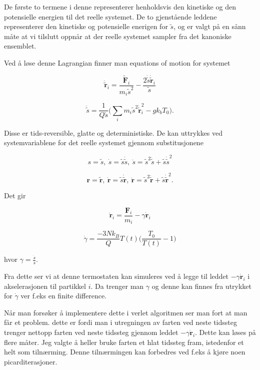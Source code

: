 \documentclass[a4paper,10pt]{article}
\begin{document}
De første to termene i denne representerer henholdsvis den kinetiske og den potensielle energien til det reelle systemet. De to gjenstående leddene representerer den kinetiske og potensielle enerigen for $\tilde{s}$, og er valgt på en sånn måte at vi tilslutt oppnår at der reelle systemet sampler fra det kanoniske ensemblet.

Ved å løse denne Lagrangian finner man equations of motion for systemet

\begin{equation}
 \mathbf{\ddot{\tilde{r}}}_i = \frac{\mathbf{\tilde{F}}_i}{m_i\tilde{s}^2}-\frac{2\dot{\tilde{s}}\mathbf{\dot{\tilde{r}}}_i}{\tilde{s}}
\end{equation}

\begin{equation}
 \ddot{\tilde{s}} = \frac{1}{Q\tilde{s}}\bigg(\sum_im_i\tilde{s}^2\mathbf{\dot{\tilde{r}}}_i^2-gk_bT_0\bigg).
\end{equation}

Disse er tids-reversible, glatte og deterministiske. De kan uttrykkes ved systemvariablene for det reelle systemet gjennom substitusjonene


\begin{equation}
 s = \tilde{s},\ \dot{s} = \tilde{s}\dot{\tilde{s}},\ \ddot{s} = \tilde{s}^2\ddot{\tilde{s}} + \tilde{s}\dot{\tilde{s}}^2
\end{equation}

\begin{equation}
  \mathbf{r} = \tilde{\mathbf{r}},\ \dot{\mathbf{r}} = \tilde{s}\dot{\tilde{\mathbf{r}}},\ \ddot{\mathbf{r}} = \tilde{s}^2\ddot{\tilde{\mathbf{r}}} + \tilde{s}\dot{\tilde{\mathbf{r}}}^2.
\end{equation}

Det gir

\begin{equation}
 \mathbf{\ddot{r}}_i = \frac{\mathbf{F}_i}{m_i}-\gamma\mathbf{\dot{r}}_i
\end{equation}

\begin{equation}
 \dot{\gamma} = \frac{-3Nk_B}{Q}T(t)\bigg(\frac{T_0}{T(t)}-1\bigg)
\end{equation}

hvor $\gamma = \frac{\dot{s}}{s}$.  

Fra dette ser vi at denne termostaten kan simuleres ved å legge til leddet $-\gamma\mathbf{\dot{r}}_i$ i akselerasjonen til partikkel $i$. Da trenger man $\gamma$ og denne kan finnes fra utrykket for $\dot{\gamma}$ ver f.eks en finite difference. 

Når man forsøker å implementere dette i verlet algoritmen ser man fort at man får et problem. dette er fordi man i utregningen av farten ved neste tidssteg trenger nettopp farten ved neste tidssteg gjennom leddet $-\gamma\mathbf{\dot{r}}_i$. Dette kan løses på flere måter. Jeg valgte å heller bruke farten et hlat tidssteg fram, istedenfor et helt som tilnærming. Denne tilnærmingen kan forbedres ved f.eks å kjøre noen picarditerasjoner. 
\end{document}
